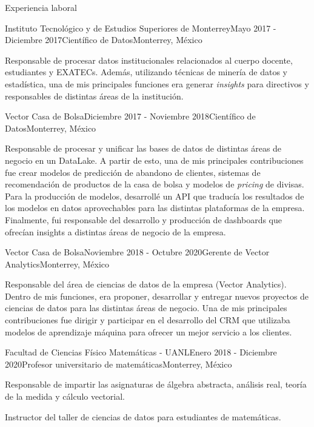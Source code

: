 \documentclass{resume} %
\begin{document}
\begin{rSection}{Experiencia laboral}

\begin{rSubsection}{Instituto Tecnológico y de Estudios Superiores de Monterrey}{Mayo 2017 - Diciembre 2017}{Científico de Datos}{Monterrey, México}
\item Responsable de procesar datos institucionales relacionados al cuerpo docente, estudiantes y EXATECs. Además, utilizando técnicas de minería de datos y estadística, una de mis principales funciones era generar \textit{insights} para directivos y responsables de distintas áreas de la institución.
\end{rSubsection}


\begin{rSubsection}{Vector Casa de Bolsa}{Diciembre 2017 - Noviembre 2018}{Científico de Datos}{Monterrey, México}
\item Responsable de procesar y unificar las bases de datos de distintas áreas de negocio en un DataLake. A partir de esto, una de mis principales contribuciones fue crear modelos de predicción de abandono de clientes, sistemas de recomendación de productos de la casa de bolsa y modelos de \textit{pricing} de divisas. Para la producción de modelos, desarrollé un API que traducía los resultados de los modelos en datos aprovechables para las distintas plataformas de la empresa. Finalmente, fui responsable del desarrollo y producción de dashboards que ofrecían insights a distintas áreas de negocio de la empresa.
\end{rSubsection}



\begin{rSubsection}{Vector Casa de Bolsa}{Noviembre 2018 - Octubre 2020}{Gerente de Vector Analytics}{Monterrey, México}
\item Responsable del área de ciencias de datos de la empresa (Vector Analytics). Dentro de mis funciones, era proponer, desarrollar y entregar nuevos proyectos de ciencias de datos para las distintas áreas de negocio. Una de mis principales contribuciones fue dirigir y participar en el desarrollo del CRM que utilizaba modelos de aprendizaje máquina para ofrecer un mejor servicio a los clientes. 
\end{rSubsection}


\begin{rSubsection}{Facultad de Ciencias Físico Matemáticas - UANL}{Enero 2018 - Diciembre 2020}{Profesor universitario de matemáticas}{Monterrey, México}
\item Responsable de impartir las asignaturas de álgebra abstracta, análisis real, teoría de la medida y cálculo vectorial.
\item Instructor del taller de ciencias de datos para estudiantes de matemáticas.
\end{rSubsection}

\end{rSection}
\end{document}
